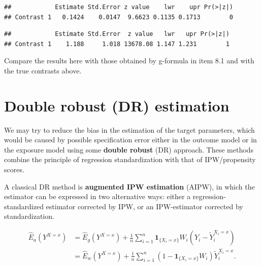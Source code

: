 \documentclass[
]{book}
\newenvironment{Shaded}{\begin{snugshade}}{\end{snugshade}}
\newcommand{\AttributeTok}[1]{\textcolor[rgb]{0.13,0.29,0.53}{#1}}
\newcommand{\DecValTok}[1]{\textcolor[rgb]{0.00,0.00,0.81}{#1}}
\newcommand{\FunctionTok}[1]{\textcolor[rgb]{0.13,0.29,0.53}{\textbf{#1}}}
\newcommand{\NormalTok}[1]{#1}
\newcommand{\SpecialCharTok}[1]{\textcolor[rgb]{0.81,0.36,0.00}{\textbf{#1}}}
\newcommand{\StringTok}[1]{\textcolor[rgb]{0.31,0.60,0.02}{#1}}
\theoremstyle{definition}
\theoremstyle{definition}
\theoremstyle{definition}
\theoremstyle{definition}
\theoremstyle{remark}
\begin{document}
\begin{Shaded}
\end{Shaded}

\begin{verbatim}
##            Estimate Std.Error z value    lwr    upr Pr(>|z|)
## Contrast 1   0.1424    0.0147  9.6623 0.1135 0.1713        0
\end{verbatim}

\begin{Shaded}
\end{Shaded}

\begin{verbatim}
##            Estimate Std.Error  z value   lwr   upr Pr(>|z|)
## Contrast 1    1.188     1.018 13678.08 1.147 1.231        1
\end{verbatim}

Compare the results here with those obtained by g-formula in item 8.1
and with the true contrasts above.

\section{Double robust (DR) estimation}\label{double-robust-dr-estimation}

We may try to reduce the bias in the estimation of the target
parameters, which would be caused by possible specification error either
in the outcome model or in the exposure model using some
\textbf{double robust} (DR) approach. These methods combine the principle of
regression standardization with that of IPW/propensity scores.

A classical DR method is \textbf{augmented IPW estimation} (AIPW), in which the
estimator can be expressed in two alternative ways: either a
regression-standardized estimator corrected by IPW, or
an IPW-estimator corrected by standardization.

\[\begin{aligned}
 \widehat{E}_a(Y^{X=x}) 
       & = \widehat{E}_g(Y^{X=x}) +
\frac{1}{n} \sum_{i=1}^n  {\mathbf 1}_{\{X_i=x\}} W_i 
                   ( Y_i - \widetilde{Y}_i^{X_i=x} )   \\
       & = \widehat{E}_w(Y^{X=x}) +
\frac{1}{n} \sum_{i=1}^n ( 1 - {\mathbf 1}_{\{X_i=x\}} W_i ) 
                      \widetilde{Y}_i^{X_i=x}.
\end{aligned}\]
\end{document}
